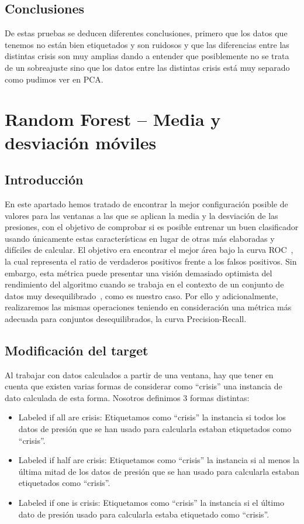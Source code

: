 \documentclass[a4paper,12pt,twoside,oldfontcommands]{memoir}
\begin{document}
\section{Conclusiones}
De estas pruebas se deducen diferentes conclusiones, primero que los datos que tenemos no están bien etiquetados y son ruidosos y que las diferencias entre las distintas crisis son muy amplias dando a entender que posiblemente no se trata de un sobreajuste sino que los datos entre las distintas crisis está muy separado como pudimos ver en PCA.


\chapter{Random Forest -- Media y desviación móviles} 
\section{Introducción}
En este apartado hemos tratado de encontrar la mejor configuración posible de valores para las ventanas a las que se aplican la media y la desviación de las presiones, con el objetivo de comprobar si es posible entrenar un buen clasificador usando únicamente estas características en lugar de otras más elaboradas y difíciles de calcular. El objetivo era encontrar el mejor área bajo la curva ROC~\cite{galar2012review}, la cual representa el ratio de verdaderos positivos frente a los falsos positivos. Sin embargo, esta métrica puede presentar una visión demasiado optimista del rendimiento del algoritmo cuando se trabaja en el contexto de un conjunto de datos muy desequilibrado~\cite{Davis2006RPR, saito2015pr}, como es nuestro caso. Por ello y adicionalmente, realizaremos las mismas operaciones teniendo en consideración una métrica más adecuada para conjuntos desequilibrados, la curva Precision-Recall. 

\section{Modificación del target}
Al trabajar con datos calculados a partir de una ventana, hay que tener en cuenta que existen varias formas de considerar como ``crisis'' una instancia de dato calculada de esta forma. Nosotros definimos 3 formas distintas: 

\begin{itemize}
    \item Labeled if all are crisis: Etiquetamos como ``crisis'' la instancia si todos los datos de presión que se han usado para calcularla estaban etiquetados como ``crisis''. 
    \item Labeled if half are crisis: Etiquetamos como ``crisis'' la instancia si al menos la última mitad de los datos de presión que se han usado para calcularla estaban etiquetados como ``crisis''. 
    \item Labeled if one is crisis: Etiquetamos como ``crisis'' la instancia si el último dato de presión usado para calcularla estaba etiquetado como ``crisis''. 
\end{itemize}
\end{document}

